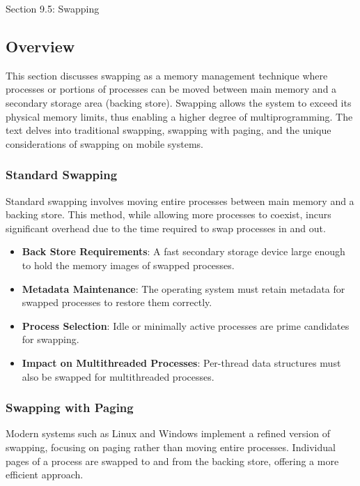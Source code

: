 \begin{notes}{Section 9.5: Swapping}
    \subsection*{Overview}

    This section discusses swapping as a memory management technique where processes or portions of processes can be moved between main memory and a secondary storage area (backing store). Swapping 
    allows the system to exceed its physical memory limits, thus enabling a higher degree of multiprogramming. The text delves into traditional swapping, swapping with paging, and the unique 
    considerations of swapping on mobile systems.
    
    \subsubsection*{Standard Swapping}
    
    Standard swapping involves moving entire processes between main memory and a backing store. This method, while allowing more processes to coexist, incurs significant overhead due to the time 
    required to swap processes in and out.
    
    \begin{highlight}
        \begin{itemize}
            \item \textbf{Back Store Requirements}: A fast secondary storage device large enough to hold the memory images of swapped processes.
            \item \textbf{Metadata Maintenance}: The operating system must retain metadata for swapped processes to restore them correctly.
            \item \textbf{Process Selection}: Idle or minimally active processes are prime candidates for swapping.
            \item \textbf{Impact on Multithreaded Processes}: Per-thread data structures must also be swapped for multithreaded processes.
        \end{itemize}
    \end{highlight}
    
    \subsubsection*{Swapping with Paging}
    
    Modern systems such as Linux and Windows implement a refined version of swapping, focusing on paging rather than moving entire processes. Individual pages of a process are swapped to and from the 
    backing store, offering a more efficient approach.
    

\end{notes}
